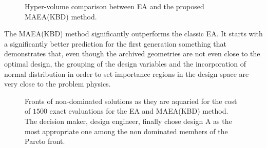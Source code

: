 \begin{figure}[h!]
\begin{minipage}[b]{1\linewidth}
 \centering
\end{minipage}
\caption{Hyper-volume comparison between EA and the proposed MAEA(KBD) method.}
\label{Francis-Res}
\end{figure}

The MAEA(KBD) method significantly outperforms the classic EA. It starts with a significantly better prediction for the first generation something that demonstrates that, even though the  archived geometries are not even close to the optimal design, the grouping of the design variables and the incorporation of normal distribution in order to set importance regions in the design space are very close to the problem physics.    

\begin{figure}[h!]
\begin{minipage}[b]{1\linewidth}
 \centering
\end{minipage}
\caption{Fronts of non-dominated solutions as they are aquaried for the cost of $1500$ exact evaluations for the EA and MAEA(KBD) method. The decision maker, design engineer, finally chose design A as the most appropriate one among the non dominated members of the Pareto front.}
\label{Francis-Res-par}
\end{figure}

